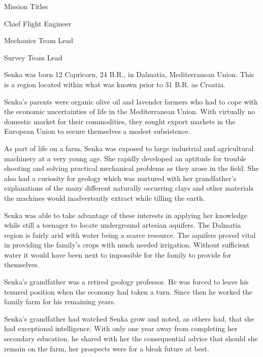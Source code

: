 {        \bTR
            \bTC Mission Titles \eTC
            \bTC 
                \startitemize[4]
                \startpacked
                \item Chief Flight Engineer
                \item Mechanics Team Lead
                \item Survey Team Lead
                \stoppacked
                \stopitemize
            \eTC
        \eTR
    \eTABLEbody

\eTABLE
}

Senka was born 12 Capricorn, 24 B.R., in Dalmatia, Mediterranean Union. This is a region located within what was known prior to 31 B.R. as Croatia.

Senka's parents were organic olive oil and lavender farmers who had to cope with the economic uncertainties of life in the Mediterranean Union. With virtually no domestic market for their commodities, they sought export markets in the European Union to secure themselves a modest subsistence.

As part of life on a farm, Senka was exposed to large industrial and agricultural machinery at a very young age. She rapidly developed an aptitude for trouble shooting and solving practical mechanical problems as they arose in the field. She also had a curiosity for geology which was nurtured with her grandfather's explanations of the many different naturally occurring clays and other materials the machines would inadvertently extract while tilling the earth. 

Senka was able to take advantage of these interests in applying her knowledge while still a teenager to locate underground artesian aquifers. The Dalmatia region is fairly arid with water being a scarce resource. The aquifers proved vital in providing the family's crops with much needed irrigation. Without sufficient water it would have been next to impossible for the family to provide for themselves.

Senka's grandfather was a retired geology professor. He was forced to leave his tenured position when the economy had taken a turn. Since then he worked the family farm for his remaining years.

Senka's grandfather had watched Senka grow and noted, as others had, that she had exceptional intelligence. With only one year away from completing her secondary education, he shared with her the consequential advice that should she remain on the farm, her prospects were for a bleak future at best.

